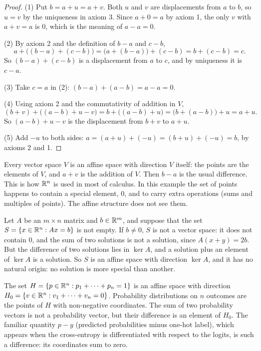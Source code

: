 \begin{notechapter}
\begin{proof}
(1) Put $b = a + u = a + v$. Both $u$ and $v$ are displacements from $a$ to
$b$, so $u = v$ by the uniqueness in axiom 3. Since $a + 0 = a$ by axiom 1,
the only $v$ with $a + v = a$ is $0$, which is the meaning of $a - a = 0$.

(2) By axiom 2 and the definition of $b - a$ and $c - b$,
\[
  a + \bigl((b - a) + (c - b)\bigr) = \bigl(a + (b - a)\bigr) + (c - b)
  = b + (c - b) = c .
\]
So $(b - a) + (c - b)$ is a displacement from $a$ to $c$, and by uniqueness
it is $c - a$.

(3) Take $c = a$ in (2): $(b - a) + (a - b) = a - a = 0$.

(4) Using axiom 2 and the commutativity of addition in $V$,
\[
  (b + v) + \bigl((a - b) + u - v\bigr) = b + \bigl((a - b) + u\bigr)
  = \bigl(b + (a - b)\bigr) + u = a + u .
\]
So $(a - b) + u - v$ is the displacement from $b + v$ to $a + u$.

(5) Add $-u$ to both sides: $a = (a + u) + (-u) = (b + u) + (-u) = b$, by
axioms 2 and 1.
\end{proof}

\begin{example}
\label{affine-spaces:ex:vector-space}
Every vector space $V$ is an affine space with direction $V$ itself: the
points are the elements of $V$, and $a + v$ is the addition of $V$. Then
$b - a$ is the usual difference. This is how $\mathbb{R}^n$ is used in most of
calculus. In this example the set of points happens to contain a special
element, $0$, and to carry extra operations (sums and multiples of points).
The affine structure does not see them.
\end{example}

\begin{example}\label{affine-spaces:ex:system}
Let $A$ be an $m\times n$ matrix and $b\in\mathbb{R}^m$, and suppose that the set
$S = \{x\in\mathbb{R}^n : Ax = b\}$ is not empty. If $b\neq0$, $S$ is not a vector
space: it does not contain $0$, and the sum of two solutions is not a
solution, since $A(x + y) = 2b$. But the difference of two solutions lies
in $\ker A$, and a solution plus an element of $\ker A$ is a solution. So
$S$ is an affine space with direction $\ker A$, and it has no natural
origin: no solution is more special than another.
\end{example}

\begin{example}\label{affine-spaces:ex:simplex}
The set $H = \{p\in\mathbb{R}^n : p_1 + \dots + p_n = 1\}$ is an affine space with
direction $H_0 = \{v\in\mathbb{R}^n : v_1 + \dots + v_n = 0\}$. Probability
distributions on $n$ outcomes are the points of $H$ with non-negative
coordinates. The sum of two probability vectors is not a probability
vector, but their difference is an element of $H_0$. The familiar quantity
$p - y$ (predicted probabilities minus one-hot label), which appears when
the cross-entropy is differentiated with respect to the logits, is such a
difference: its coordinates sum to zero.
\end{example}


\end{notechapter}
